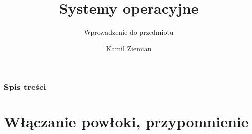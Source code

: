 \documentclass[10pt,t]{beamer}
\title{Systemy operacyjne}
\subtitle{Wprowadzenie do przedmiotu}
\author{Kamil Ziemian \\
  \email}
\begin{document}





\RaggedRight





\maketitle





\begin{frame}
  \frametitle{Spis treści}


  \tableofcontents

\end{frame}





\section{Włączanie powłoki, przypomnienie}
\end{document}
